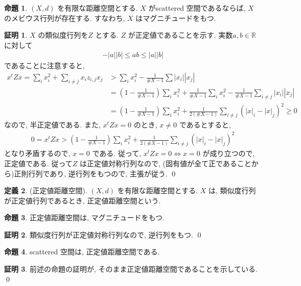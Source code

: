 \documentclass[10pt, fleqn, label-section=none]{bxjsarticle}
\theoremstyle{definition}
\newtheorem{dfn}{定義}[section]
\newtheorem{prop}[dfn]{命題}
\newtheorem*{pf*}{証明}
\newcommand{\abs}[1]{\left|#1\right|}
\newcommand{\LR}{\Leftrightarrow}
\renewcommand{\;}{\, ; \,}
\begin{document}
\begin{prop}$(X, d)$ を有限な距離空間とする. $X$ がscattered 空間であるならば, 
$X$ のメビウス行列が存在する. すなわち, $X$ はマグニチュードをもつ. 
\end{prop}
\begin{pf*}$X$ の類似度行列を$Z$ とする. $Z$ が正定値であることを示す. 実数$a,b \in \mathbb R$ に対して
\begin{align*} -\abs a \abs b \leq a b \leq \abs a \abs b \end{align*}
であることに注意すると, 
\begin{align*} x^t Z x = \sum_i x_i^2 + \sum_{i \neq j} x_i z_{i, j} x_j &> \sum_i  x_i^2 - \frac{1}{\# X - 1} \sum \abs{x_i} \abs{x_j} \\ &= (1 - \frac{1}{\# X - 1} )\sum_i x_i^2 + \frac{1}{\# X - 1 } \sum_i  x_i^2 - \frac{1}{\# X - 1} \sum_
{i \neq j} \abs{x_i} \abs{x_j} \\&=    (1 - \frac{1}{\# X - 1} )\sum_i x_i^2 + \frac{1}{2(\# X - 1)} \sum_{i \neq j} (\abs x_i  - \abs x_j )^2 \geq 0 \end{align*}
なので, 半正定値である. また, $x^t Z x = 0$ のとき, $x \neq 0$ であるとすると, 
\begin{align*} 0 = x^t Z x > (1 - \frac{1}{\# X - 1} )\sum_i x_i^2 + \frac{1}{2(\# X - 1)} \sum_{i \neq j} (\abs x_i  - \abs x_j )^2  \end{align*}
となり矛盾するので, $x = 0$ である. 従って, $x^t Z x = 0 \LR x = 0$ が成り立つので, 正定値である. 従って$Z$ は正定値対称行列なので, (固有値が全て正であることから)正則行列であり, 逆行列をもつので, 主張が従う.
\qed
\end{pf*}

\begin{dfn}(正定値距離空間). $(X, d)$ を有限な距離空間とする. $X$ は, 類似度行列が正定値行列であるとき, 正定値距離空間という.

\end{dfn}

\begin{prop}正定値距離空間は, マグニチュードをもつ.

\end{prop}
\begin{pf*}
類似度行列が正定値対称行列なので, 逆行列をもつ. 
\qed
\end{pf*}

\begin{prop}scattered 空間は, 正定値距離空間である.

\end{prop}
\begin{pf*}
前述の命題の証明が, そのまま正定値距離空間であることを示している.
\qed
\end{pf*}
\end{document}
